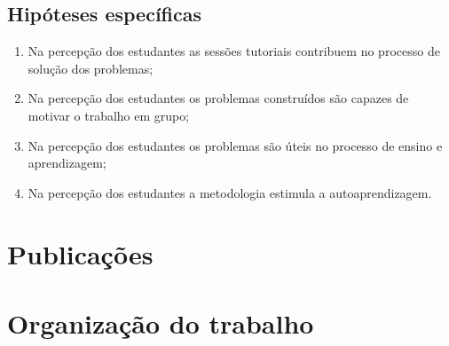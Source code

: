 \subsection{Hipóteses específicas}
\begin{enumerate}
\item{Na percepção dos estudantes as sessões tutoriais contribuem no processo de solução dos problemas;}
\item{Na percepção dos estudantes os problemas construídos são capazes de motivar o trabalho em grupo;}
\item{Na percepção dos estudantes os problemas são úteis no processo de ensino e aprendizagem;}
\item{Na percepção dos estudantes a metodologia estimula a autoaprendizagem.}
\end{enumerate}

\section{Publicações}
\section{Organização do trabalho}
